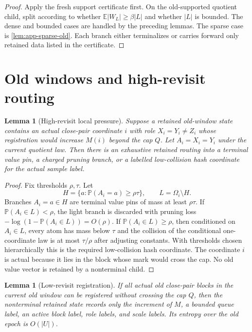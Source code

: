\documentclass[11pt]{article}
\newcommand{\Cref}[1]{\ref{#1}}
\newtheorem{lemma}[theorem]{Lemma}
\theoremstyle{remark}
\newcommand{\E}{\mathbb E}
\newcommand{\Prob}{\mathbb P}
\begin{document}
\begin{proof}
Apply the fresh support certificate first.  On the old-supported quotient child, split according to whether $\E|W_L|\ge \beta |L|$ and whether $|L|$ is bounded.  The dense and bounded cases are handled by the preceding lemmas.  The sparse case is \Cref{lem:app-sparse-old}.  Each branch either terminalizes or carries forward only retained data listed in the certificate.
\end{proof}

\section{Old windows and high-revisit routing}\label{app:old-window}

\begin{lemma}[High-revisit local pressure]\label{lem:app-high-revisit}
Suppose a retained old-window state contains an actual close-pair coordinate $i$ with role $X_i=Y_i\ne Z_i$ whose registration would increase $M(i)$ beyond the cap $Q$.  Let $A_i=X_i=Y_i$ under the current quotient law.  Then there is an exhaustive retained routing into a terminal value pin, a charged pruning branch, or a labelled low-collision hash coordinate for the actual sample label.
\end{lemma}

\begin{proof}
Fix thresholds $\rho,\tau$.  Let
\[
        H=\{a:\Prob(A_i=a)\ge \rho\tau\},\qquad L=\Omega_i\setminus H.
\]
Branches $A_i=a\in H$ are terminal value pins of mass at least $\rho\tau$.  If $\Prob(A_i\in L)<\rho$, the light branch is discarded with pruning loss $-\log(1-\Prob(A_i\in L))=O(\rho)$.  If $\Prob(A_i\in L)\ge \rho$, then conditioned on $A_i\in L$, every atom has mass below $\tau$ and the collision of the conditional one-coordinate law is at most $\tau/\rho$ after adjusting constants.  With thresholds chosen hierarchically this is the required low-collision hash coordinate.  The coordinate $i$ is actual because it lies in the block whose mark would cross the cap.  No old value vector is retained by a nonterminal child.
\end{proof}

\begin{lemma}[Low-revisit registration]\label{lem:app-low-revisit}
If all actual old close-pair blocks in the current old window can be registered without crossing the cap $Q$, then the nonterminal retained state records only the increment of $M$, a bounded queue label, an active block label, role labels, and scale labels.  Its entropy over the old epoch is $O(|U|)$.
\end{lemma}
\end{document}
